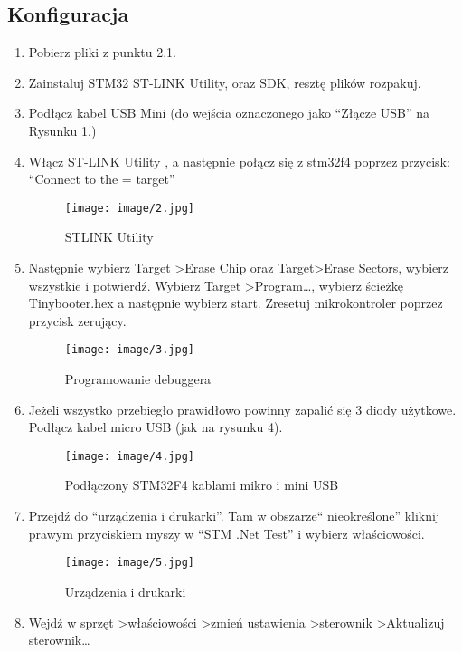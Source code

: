\documentclass{article}
\begin{document}
\subsection{Konfiguracja}
\begin{enumerate}
\item Pobierz pliki z punktu 2.1.
\item Zainstaluj STM32 ST-LINK Utility, oraz SDK, resztę plików rozpakuj.
\item Podłącz kabel USB Mini (do wejścia oznaczonego jako “Złącze USB” na Rysunku 1.)
\item Włącz ST-LINK Utility , a następnie połącz się z stm32f4 poprzez przycisk: “Connect to the = target”

\begin{figure}[H]
\texttt{[image: image/2.jpg]}
\caption{STLINK Utility}
\end{figure}

\item Następnie wybierz Target \textgreater Erase Chip oraz Target\textgreater Erase Sectors, wybierz wszystkie i potwierdź. Wybierz Target \textgreater Program…, wybierz ścieżkę Tinybooter.hex a następnie wybierz start. Zresetuj mikrokontroler poprzez przycisk zerujący.

\begin{figure}[H]
\texttt{[image: image/3.jpg]}
\caption{Programowanie debuggera}
\end{figure}

\item Jeżeli wszystko przebiegło prawidłowo powinny zapalić się 3 diody użytkowe. Podłącz kabel micro USB (jak na rysunku 4).

\begin{figure}[H]
\texttt{[image: image/4.jpg]}
\caption{Podłączony STM32F4 kablami mikro i mini USB}
\end{figure}

\item Przejdź do “urządzenia i drukarki”. Tam w obszarze“ nieokreślone” kliknij prawym przyciskiem myszy w “STM .Net Test” i wybierz właściowości.

\begin{figure}[H]
\texttt{[image: image/5.jpg]}
\caption{Urządzenia i drukarki}
\end{figure}

\item Wejdź w sprzęt \textgreater właściowości \textgreater zmień ustawienia \textgreater sterownik \textgreater Aktualizuj sterownik…


\end{enumerate}
\end{document}
